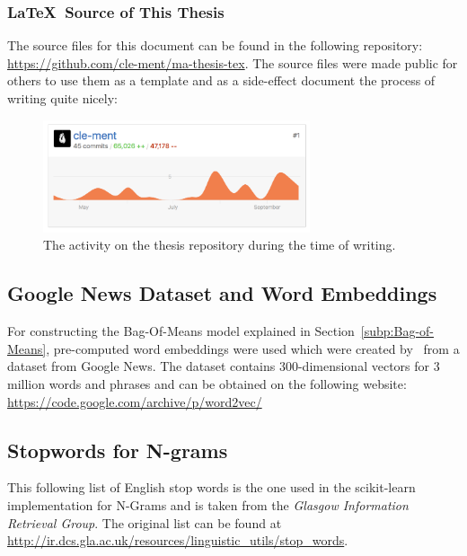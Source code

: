 \subsubsection*{\LaTeX\ Source of This Thesis}
\label{sub:This Thesis}

The source files for this document can be found in the following repository: \url{https://github.com/cle-ment/ma-thesis-tex}. The source files were made public for others to use them as a template and as a side-effect document the process of writing quite nicely:

\begin{figure}[h]
  \centering
  \includegraphics[width=0.7\textwidth]{img/git-tex.png}
  \caption{The activity on the thesis repository during the time of writing.}
\label{fig:git repo activity}
\end{figure}

\subsection{Google News Dataset and Word Embeddings}
\label{sub:Google News Dataset and Word Embeddings}

For constructing the Bag-Of-Means model explained in Section~\ref{subp:Bag-of-Means}, pre-computed word embeddings were used which were created by~\cite{Mikolov:2013ab} from a dataset from Google News. The dataset contains 300-dimensional vectors for 3 million words and phrases and can be obtained on the following website: \url{https://code.google.com/archive/p/word2vec/}

\clearpage
\subsection{Stopwords for N-grams}
\label{sub:Stopwords for N-grams}

This following list of English stop words is the one used in the \gls{scikit-learn} implementation for N-Grams and is taken from the \emph{Glasgow Information Retrieval Group}. The original list can be found at \url{http://ir.dcs.gla.ac.uk/resources/linguistic_utils/stop_words}.

